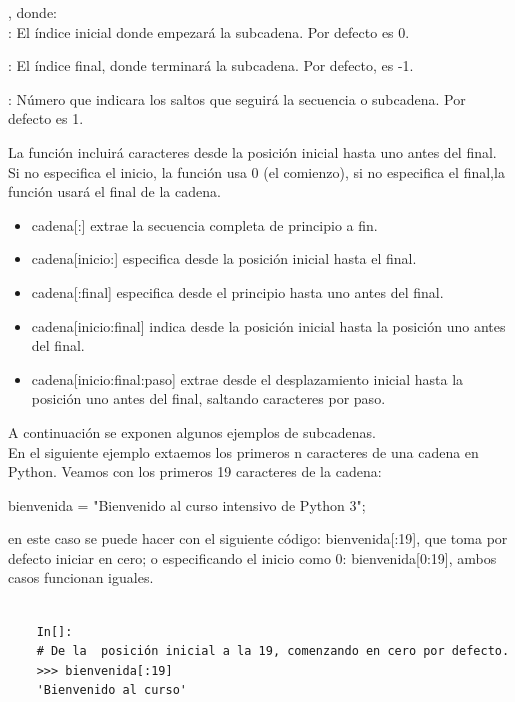 , donde:\\


: El índice inicial donde empezará la subcadena. Por defecto es 0.

: El índice final, donde terminará la subcadena. Por defecto, es -1.

: Número que indicara los saltos que seguirá la secuencia o subcadena. Por defecto es 1.


La función   incluirá caracteres desde la posición  inicial  hasta uno antes del final. Si no especifica el inicio, la función usa 0 (el comienzo), si no especifica el final,la función usará  el final  de la cadena.\\
\begin{itemize}
	\item[]  {\ttfamily cadena[:]} extrae la secuencia completa de principio a fin.
	
	\item[] {\ttfamily  cadena[inicio:]} especifica desde la posición inicial hasta el final.
	
	\item[] {\ttfamily  cadena[:final]} especifica  desde el principio hasta uno antes del final.
	
	\item[]  {\ttfamily cadena[inicio:final]} indica desde la posición inicial hasta la posición uno antes del final.
	
	\item[]  {\ttfamily cadena[inicio:final:paso]} extrae desde el desplazamiento inicial hasta la posición uno antes del final, saltando caracteres por paso.
\end{itemize}


A continuación se exponen algunos ejemplos de subcadenas.\\

En el siguiente ejemplo extaemos los primeros n caracteres de una cadena en Python.  Veamos con los primeros 19 caracteres de la cadena:

{\ttfamily  bienvenida = "Bienvenido al curso intensivo de Python 3"{}}; 

\noindent en este caso  se puede hacer con el siguiente código:  {\ttfamily bienvenida[:19]}, que toma por defecto  iniciar en cero; o especificando el inicio como 0: {\ttfamily bienvenida[0:19]}, ambos casos funcionan iguales.

\begin{lstlisting}
	
	In[]:
	# De la  posición inicial a la 19, comenzando en cero por defecto.
	>>> bienvenida[:19]
	'Bienvenido al curso'
\end{lstlisting}

